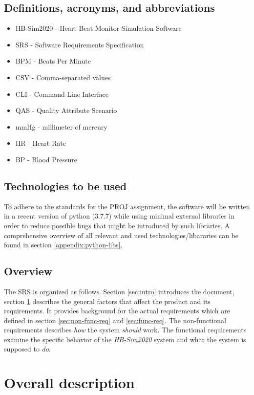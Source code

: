 \documentclass[a4paper]{article}
\begin{document}
\subsection{Definitions, acronyms, and abbreviations}
\begin{itemize}
    \item HB-Sim2020 - Heart Beat Monitor Simulation Software
    \item SRS - Software Requirements Specification
    \item BPM - Beats Per Minute
    \item CSV - Comma-separated values
    \item CLI - Command Line Interface
    \item QAS - Quality Attribute Scenario
    \item mmHg - millimeter of mercury
    \item HR - Heart Rate
    \item BP - Blood Pressure
\end{itemize}

\subsection{Technologies to be used}
To adhere to the standards for the PROJ assignment, the software will be written in a recent version of python (3.7.7) while using minimal external libraries in order to reduce possible bugs that might be introduced by such libraries. A comprehensive overview of all relevant and used technologies/libararies can be found in section \ref{appendix:python-libs}. 

\subsection{Overview}
The SRS is organized as follows. Section \ref{sec:intro} introduces the document, section \ref{sec:overall} describes the general factors that affect the product and its requirements. It provides background for the actual requirements which are defined in section \ref{sec:non-func-req} and \ref{sec:func-req}. The non-functional requirements describes \textit{how} the system \textit{should} work. The functional requirements examine the specific behavior of the \textit{HB-Sim2020} system and what the system is supposed to \textit{do}.


\clearpage
\section{Overall description}
\label{sec:overall}

\end{document}
